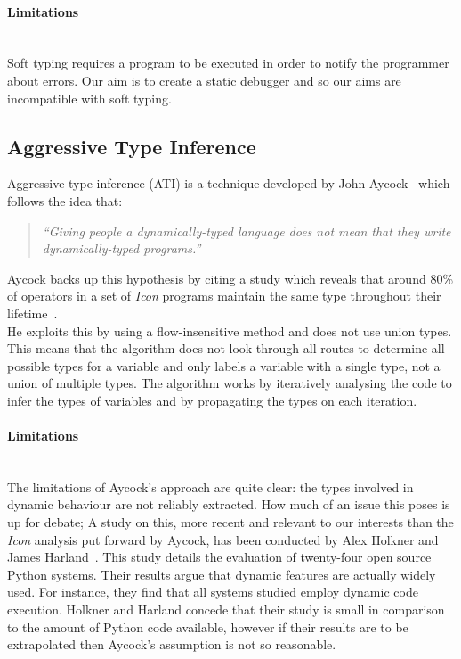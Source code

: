 \documentclass[12pt, titlepage]{article}
\begin{document}
\paragraph{Limitations}\mbox{} \\
Soft typing requires a program to be executed in order to notify the programmer about errors. Our aim is to create a static debugger and so our aims are incompatible with soft typing.

\subsection{Aggressive Type Inference}
Aggressive type inference (ATI) is a technique developed by John Aycock~\cite{aggressiveType} which follows the idea that:
\begin{quote}
	\emph{``Giving people a dynamically-typed language does not mean that they write dynamically-typed programs.''}
\end{quote}
Aycock backs up this hypothesis by citing a study which reveals that around 80\% of operators in a set of \textit{Icon} programs maintain the same type throughout their lifetime~\cite{typeInferenceIcon}. \\
\indent He exploits this by using a flow-insensitive method and does not use union types. This means that the algorithm does not look through all routes to determine all possible types for a variable and only labels a variable with a single type, not a union of multiple types. The algorithm works by iteratively analysing the code to infer the types of variables and by propagating the types on each iteration.
\paragraph{Limitations}\mbox{}\\
The limitations of Aycock's approach are quite clear: the types involved in dynamic behaviour are not reliably extracted. How much of an issue this poses is up for debate;
A study on this, more recent and relevant to our interests than the \textit{Icon} analysis put forward by Aycock, has been conducted by Alex Holkner and James Harland~\cite{evaluatingDynamicBehaviour}. This study details the evaluation of twenty-four open source Python systems. Their results argue that dynamic features are actually widely used. For instance, they find that all systems studied employ dynamic code execution. Holkner and Harland concede that their study is small in comparison to the amount of Python code available, however if their results are to be extrapolated then Aycock's assumption is not so reasonable.
\end{document}
